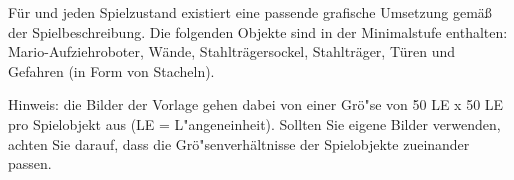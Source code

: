 F\"ur \everyObject{} und jeden Spielzustand existiert eine passende grafische Umsetzung gem\"a\ss{} der Spielbeschreibung. Die folgenden Objekte sind in der Minimalstufe enthalten: Mario-Aufziehroboter, Wände, Stahltr\"agersockel, Stahltr\"ager, T\"uren und Gefahren (in Form von Stacheln).

Hinweis: die Bilder der Vorlage gehen dabei von einer Gr\"o"se von 50 LE x 50 LE pro Spielobjekt aus (LE = L"angeneinheit). Sollten Sie eigene Bilder verwenden, achten Sie darauf, dass die Gr\"o"senverh\"altnisse der Spielobjekte zueinander passen.